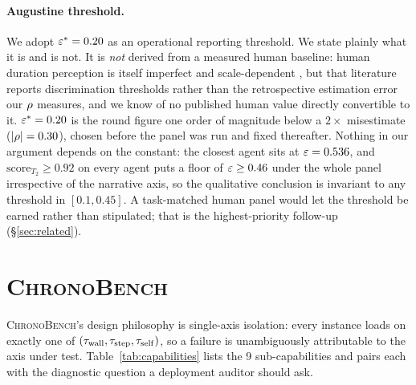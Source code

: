\documentclass{article}
\begin{document}
\paragraph{Augustine threshold.} We adopt $\varepsilon^{*} = 0.20$ as an operational reporting threshold. We state plainly what it is and is not. It is \emph{not} derived from a measured human baseline: human duration perception is itself imperfect and scale-dependent \citep{wittmann2009chronoception,eagleman2008time}, but that literature reports discrimination thresholds rather than the retrospective estimation error our $\rho$ measures, and we know of no published human value directly convertible to it. $\varepsilon^{*} = 0.20$ is the round figure one order of magnitude below a $2\times$ misestimate ($|\rho| = 0.30$), chosen before the panel was run and fixed thereafter. Nothing in our argument depends on the constant: the closest agent sits at $\varepsilon = 0.536$, and $\mathrm{score}_{T_2} \geq 0.92$ on every agent puts a floor of $\varepsilon \geq 0.46$ under the whole panel irrespective of the narrative axis, so the qualitative conclusion is invariant to any threshold in $[0.1, 0.45]$. A task-matched human panel would let the threshold be earned rather than stipulated; that is the highest-priority follow-up (\S\ref{sec:related}).

\section{\textsc{ChronoBench}}\label{sec:bench}

\textsc{ChronoBench}'s design philosophy is single-axis isolation: every instance loads on exactly one of $(\tau_{\mathrm{wall}}, \tau_{\mathrm{step}}, \tau_{\mathrm{self}})$, so a failure is unambiguously attributable to the axis under test. Table~\ref{tab:capabilities} lists the 9 sub-capabilities and pairs each with the diagnostic question a deployment auditor should ask.
\end{document}
